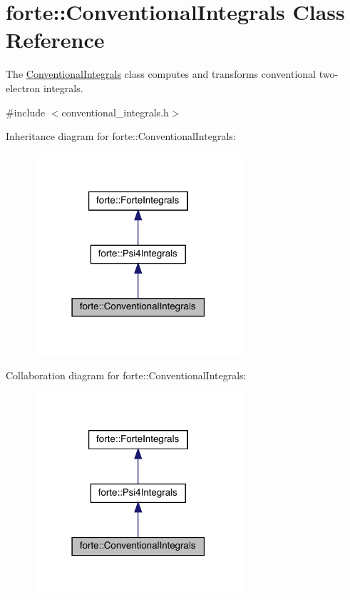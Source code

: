 \hypertarget{classforte_1_1_conventional_integrals}{}\section{forte\+:\+:Conventional\+Integrals Class Reference}
\label{classforte_1_1_conventional_integrals}


The \mbox{\hyperlink{classforte_1_1_conventional_integrals}{Conventional\+Integrals}} class computes and transforms conventional two-\/electron integrals.  




{\ttfamily \#include $<$conventional\+\_\+integrals.\+h$>$}



Inheritance diagram for forte\+:\+:Conventional\+Integrals\+:
\nopagebreak
\begin{figure}[H]
\begin{center}
\leavevmode
\includegraphics[width=219pt]{classforte_1_1_conventional_integrals__inherit__graph}
\end{center}
\end{figure}


Collaboration diagram for forte\+:\+:Conventional\+Integrals\+:
\nopagebreak
\begin{figure}[H]
\begin{center}
\leavevmode
\includegraphics[width=219pt]{classforte_1_1_conventional_integrals__coll__graph}
\end{center}
\end{figure}
